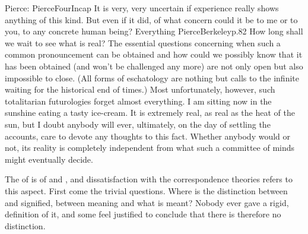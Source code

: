   
Pierce: \citet{experience shows that the calm and
  careful consideration of the same distinctly conceived premises (including
  prejudices) will insure the pronouncement of the same judgment by all
  men.}{PierceFourIncap}{} It is very, very uncertain if experience really shows
anything of this kind. But even if it did, of
what concern could it be to me or to you, to any concrete human being?
  Everything \citet{which will be thought to 
  exist in the final opinion is real, and nothing else.}{PierceBerkeley}{p.82}
How long shall we wait to see what is real?  The essential questions concerning
{when} such a common pronouncement can be obtained and how could we possibly
know that it has been obtained (and won't be challenged any more) are not only
  open but also impossible to close. (All forms of eschatology are nothing but
  calls to the infinite waiting for the historical end of times.) Most
  unfortunately, however, such totalitarian futurologies 
forget almost everything. I am sitting now in the sunshine eating a tasty
ice-cream. It is extremely real, as real as the heat of the sun, but I doubt
anybody will ever, ultimately, on the day of settling the accounts, care to
devote any thoughts to this fact. Whether anybody would or not, its reality
 is completely independent from what such a committee of minds
might eventually decide.

\pa The  of  is  of
 and , and dissatisfaction with the correspondence
theories refers to this aspect. First come the trivial questions. Where is the
 distinction between  and signified, between meaning and
what is meant? Nobody ever gave a rigid,  definition of it, and some feel
justified to conclude that there is therefore no distinction.

